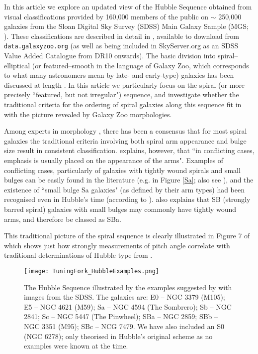 \documentclass[usenatbib]{mn2e}
\begin{document}
 In this article we explore an updated view of the Hubble Sequence obtained from visual classifications provided by 160,000 members of the public on $\sim$ 250,000 galaxies from the Sloan Digital Sky Survey (SDSS) Main Galaxy Sample (MGS; \citealt{Strauss2002}). These classifications are described in detail in \citet{Willett2013}, available to download from {\tt data.galaxyzoo.org} (as well as being included in SkyServer.org as an SDSS Value Added Catalogue from DR10 \citep{DR10} onwards). The basic division into spiral--elliptical (or featured--smooth in the language of Galaxy Zoo, which corresponds to what many astronomers mean by late- and early-type) galaxies has been discussed at length \citep[e.g.][]{Willett2013}. In this article we particularly focus on the spiral (or more precisely ``featured, but not irregular") sequence, and investigate whether the traditional criteria for the ordering of spiral galaxies along this sequence fit in with the picture revealed by Galaxy Zoo morphologies. 

Among experts in morphology \citep[e.g.][]{Sandage2005,Buta2013}, there has been a consensus that for most spiral galaxies the traditional criteria involving both spiral arm appearance and bulge size result in consistent classification. \citet{Buta2013} explains, however, that ``in conflicting cases, emphasis is usually placed on the appearance of the arms". Examples of conflicting cases, particularly of galaxies with tightly wound spirals and small bulges can be easily  found in the literature (e.g. \citealt{Hogg1993} in Figure \ref{Sa}; also see \citealt{Sandage1961, SandageBedke1994, Jore1996}), and the existence of ``small bulge Sa galaxies" (as defined by their arm types) had been recognised even in Hubble's time (according to \citealt{Sandage2005}). \citet{Buta2013} also explains that SB (strongly barred spiral) galaxies with small bulges may commonly have tightly wound arms, and therefore be classed as SBa. 

This traditional picture of the spiral sequence is clearly illustrated in Figure 7 of \citet{kennicutt1981} which shows just how strongly measurements of pitch angle correlate with traditional determinations of Hubble type from \citet{sandagetammann1981}. 

\begin{landscape}
\begin{figure}
\texttt{[image: TuningFork\_HubbleExamples.png]}
\caption{The Hubble Sequence illustrated by the examples suggested by \citet{Hubble1926} with images from the SDSS. The galaxies are: E0 -- NGC 3379 (M105); E5 -- NGC 4621 (M59);  Sa -- NGC 4594 (The Sombrero);  Sb -- NGC 2841; Sc -- NGC 5447 (The Pinwheel); SBa -- NGC 2859; SBb -- NGC 3351 (M95); SBc -- NCG 7479. We have also included an S0 (NGC 6278); only theorised in Hubble's original scheme as no examples were known at the time. \label{sequence}}
\end{figure}
\end{landscape}
\end{document}
